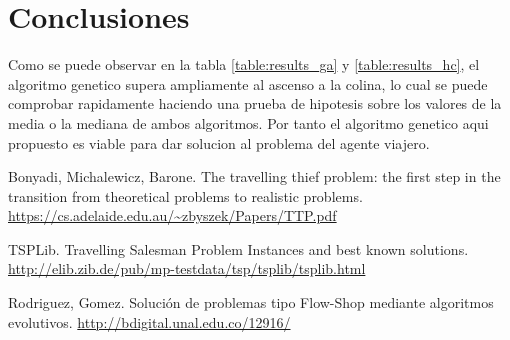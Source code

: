 \documentclass[twocolumn]{IEEEtran}
\begin{document}
\section{Conclusiones}

Como se puede observar en la tabla \ref{table:results_ga} y \ref{table:results_hc}, el algoritmo
genetico supera ampliamente al ascenso a la colina, lo cual se puede comprobar rapidamente 
haciendo una prueba de hipotesis sobre los valores de la media o la mediana de ambos algoritmos.
Por tanto el algoritmo genetico aqui propuesto es viable para dar solucion al problema del
agente viajero.

\begin{thebibliography}{X}
    \item Bonyadi, Michalewicz, Barone. The travelling thief problem: the first step in the
    transition from theoretical problems to realistic problems. \url{https://cs.adelaide.edu.au/~zbyszek/Papers/TTP.pdf}  
    \item TSPLib. Travelling Salesman Problem Instances and best known solutions.
    \url{http://elib.zib.de/pub/mp-testdata/tsp/tsplib/tsplib.html}
    \item Rodriguez, Gomez. Solución de problemas tipo Flow-Shop mediante algoritmos evolutivos.
    \url {http://bdigital.unal.edu.co/12916/}
\end{thebibliography}
\end{document}
